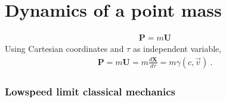 \documentclass[letterpaper,10pt,english]{jupyterBook}
\begin{document}
\section{Dynamics of a point mass}
\label{\detokenize{ch/relativity-special/notes:dynamics-of-a-point-mass}}
\sphinxAtStartPar
{}
\begin{equation*}
\begin{split}\mathbf{P} = m \mathbf{U}\end{split}
\end{equation*}
\sphinxAtStartPar
Using Cartesian coordinates and \(\tau\) as independent variable,
\begin{equation*}
\begin{split}\mathbf{P} = m \mathbf{U} = m \frac{d \mathbf{X}}{d \tau} = m \gamma (c, \vec{v}) \ .\end{split}
\end{equation*}\subsubsection*{Low\sphinxhyphen{}speed limit \sphinxhyphen{} classical mechanics}
\end{document}
